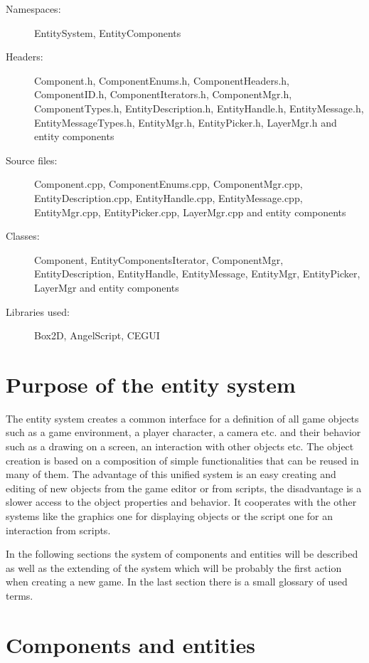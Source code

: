 \begin{description}
  \item[Namespaces:] EntitySystem, EntityComponents
  \item[Headers:] Component.h, ComponentEnums.h, ComponentHeaders.h, ComponentID.h, ComponentIterators.h, ComponentMgr.h, Com\-po\-nent\-Ty\-pes\-.h, EntityDescription.h, EntityHandle.h, EntityMessage.h, Entity\-Message\-Types.h, EntityMgr.h, EntityPicker.h, LayerMgr.h and entity components
  \item[Source files:] Component.cpp, ComponentEnums.cpp, ComponentMgr.cpp, EntityDescription.cpp, EntityHandle.cpp, EntityMessage.cpp, Entity\-Mgr.cpp, EntityPicker.cpp, LayerMgr.cpp and entity components
  \item[Classes:] Component, EntityComponentsIterator, ComponentMgr, EntityDescription, EntityHandle, EntityMessage, EntityMgr, EntityPicker, LayerMgr and entity components
  \item[Libraries used:] Box2D, AngelScript, CEGUI
\end{description}

\section{Purpose of the entity system}

The entity system creates a common interface for a definition of all game objects such as a game environment, a player character, a camera etc. and their behavior such as a drawing on a screen, an interaction with other objects etc. The object creation is based on a composition of simple functionalities that can be reused in many of them. The advantage of this unified system is an easy creating and editing of new objects from the game editor or from scripts, the disadvantage is a slower access to the object properties and behavior. It cooperates with the other systems like the graphics one for displaying objects or the script one for an interaction from scripts.

In the following sections the system of components and entities will be described as well as the extending of the system which will be probably the first action when creating a new game. In the last section there is a small glossary of used terms.

\section{Components and entities}

